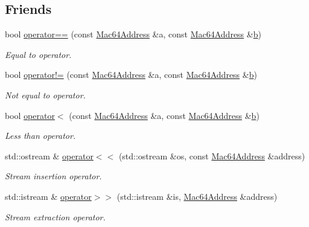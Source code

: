 \subsection*{Friends}
\begin{DoxyCompactItemize}
\item 
bool \hyperlink{classns3_1_1Mac64Address_a88e5a06074dc4f643f7f025681eb4be5}{operator==} (const \hyperlink{classns3_1_1Mac64Address}{Mac64\+Address} \&a, const \hyperlink{classns3_1_1Mac64Address}{Mac64\+Address} \&\hyperlink{lte__pathloss_8m_a21ad0bd836b90d08f4cf640b4c298e7c}{b})
\begin{DoxyCompactList}\small\item\em Equal to operator. \end{DoxyCompactList}\item 
bool \hyperlink{classns3_1_1Mac64Address_a6c6e96ec30b898a131d7d1199af92a50}{operator!=} (const \hyperlink{classns3_1_1Mac64Address}{Mac64\+Address} \&a, const \hyperlink{classns3_1_1Mac64Address}{Mac64\+Address} \&\hyperlink{lte__pathloss_8m_a21ad0bd836b90d08f4cf640b4c298e7c}{b})
\begin{DoxyCompactList}\small\item\em Not equal to operator. \end{DoxyCompactList}\item 
bool \hyperlink{classns3_1_1Mac64Address_afc6f0f9fca563c123f508a20f9c38bb1}{operator$<$} (const \hyperlink{classns3_1_1Mac64Address}{Mac64\+Address} \&a, const \hyperlink{classns3_1_1Mac64Address}{Mac64\+Address} \&\hyperlink{lte__pathloss_8m_a21ad0bd836b90d08f4cf640b4c298e7c}{b})
\begin{DoxyCompactList}\small\item\em Less than operator. \end{DoxyCompactList}\item 
std\+::ostream \& \hyperlink{classns3_1_1Mac64Address_a8aef6bb77478c883468d27a57d97d0f3}{operator$<$$<$} (std\+::ostream \&os, const \hyperlink{classns3_1_1Mac64Address}{Mac64\+Address} \&address)
\begin{DoxyCompactList}\small\item\em Stream insertion operator. \end{DoxyCompactList}\item 
std\+::istream \& \hyperlink{classns3_1_1Mac64Address_a1cbd662ef3a1e61d91227d8367853578}{operator$>$$>$} (std\+::istream \&is, \hyperlink{classns3_1_1Mac64Address}{Mac64\+Address} \&address)
\begin{DoxyCompactList}\small\item\em Stream extraction operator. \end{DoxyCompactList}\end{DoxyCompactItemize}


